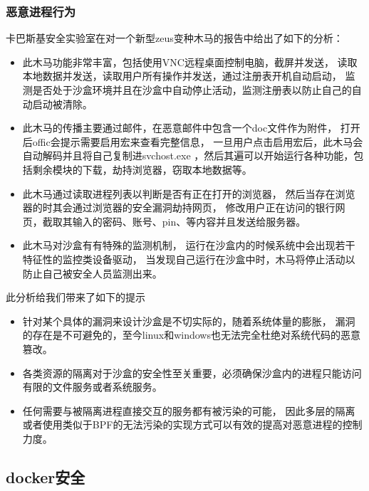 \documentclass[AutoFakeBold,a4paper]{ctexart}
\begin{document}
\subsubsection{恶意进程行为}

卡巴斯基安全实验室在对一个新型zeus变种木马的报告中给出了如下的分析：\cite{ZeuS2018}

\begin{itemize}
    \item 此木马功能非常丰富，包括使用VNC远程桌面控制电脑，截屏并发送，
    读取本地数据并发送，读取用户所有操作并发送，通过注册表开机自动启动，
    监测是否处于沙盒环境并且在沙盒中自动停止活动，监测注册表以防止自己的自动启动被清除。

    \item 此木马的传播主要通过邮件，在恶意邮件中包含一个doc文件作为附件，
    打开后offic会提示需要启用宏来查看完整信息，
    一旦用户点击启用宏后，此木马会自动解码并且将自己复制进svchost.exe
    ，然后其遍可以开始运行各种功能，包括剩余模块的下载，劫持浏览器，窃取本地数据等。
    
    \item 此木马通过读取进程列表以判断是否有正在打开的浏览器，
    然后当存在浏览器的时其会通过浏览器的安全漏洞劫持网页，
    修改用户正在访问的银行网页，截取其输入的密码、账号、pin、等内容并且发送给服务器。
    
    \item 此木马对沙盒有有特殊的监测机制，
    运行在沙盒内的时候系统中会出现若干特征性的监控类设备驱动，
    当发现自己运行在沙盒中时，木马将停止活动以防止自己被安全人员监测出来。
\end{itemize}
此分析给我们带来了如下的提示
\begin{itemize}
    \item 针对某个具体的漏洞来设计沙盒是不切实际的，随着系统体量的膨胀，
    漏洞的存在是不可避免的，至今linux和windows也无法完全杜绝对系统代码的恶意篡改。
    \item 各类资源的隔离对于沙盒的安全性至关重要，必须确保沙盒内的进程只能访问有限的文件服务或者系统服务。
    \item 任何需要与被隔离进程直接交互的服务都有被污染的可能，
    因此多层的隔离或者使用类似于BPF的无法污染的实现方式可以有效的提高对恶意进程的控制力度。
\end{itemize}


\subsection{docker安全}
\end{document}
